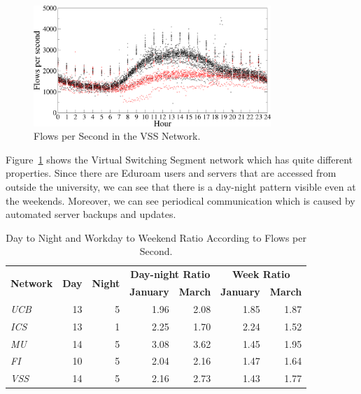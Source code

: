 \begin{figure}[!t]
        \begin{center}
                \includegraphics[width=0.8\textwidth]{figures/paper-characterization/flows-vss-jan}
                \caption{Flows per Second in the VSS Network.} \label{fig:characterization-flows-vss-jan}
        \end{center}
\end{figure}

Figure~\ref{fig:characterization-flows-vss-jan} shows the Virtual Switching Segment network which has quite different properties. Since there are Eduroam users and servers that are accessed from outside the university, we can see that there is a day-night pattern visible even at the weekends. Moreover, we can see periodical communication which is caused by automated server backups and updates.

\begin{table}[!htb]
        \centering
        \renewcommand{\arraystretch}{1.1}
        \begin{tabular}{|l|r|r|r|r|r|r|} \hline
                \multirow{2}{*}{\centering\textbf{Network}}  & \multirow{2}{*}{\centering\textbf{Day}} & \multirow{2}{*}{\centering\textbf{Night}} & \multicolumn{2}{c|}{\textbf{Day-night Ratio}}  & \multicolumn{2}{c|}{\textbf{Week Ratio}}  \\ \cline{4-7}
                & & & \textbf{January} & \textbf{March} & \textbf{January} & \textbf{March} \\ \hline
                \textit{UCB} & 13 & 5 &  1.96 & 2.08 & 1.85  & 1.87 \\ \hline
                \textit{ICS} & 13 & 1 & 2.25  & 1.70 & 2.24 & 1.52 \\ \hline
                \textit{MU} & 14 & 5 & 3.08 & 3.62 & 1.45 & 1.95 \\ \hline
                \textit{FI} & 10 & 5 & 2.04 & 2.16 & 1.47 & 1.64 \\ \hline
                \textit{VSS} & 14 & 5 & 2.16 & 2.73 & 1.43 & 1.77 \\ \hline
        \end{tabular}
        \caption{Day to Night and Workday to Weekend Ratio According to Flows per Second.}
        \label{tab:characterization-day-night-ratio}
\end{table}

